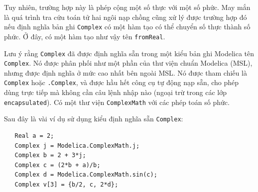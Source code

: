 Tuy nhiên, trường hợp này là phép cộng một số thực với một số phức. May mắn là quá trình tra cứu toán tử hai ngôi nạp chồng cũng xử lý được trường hợp đó nếu định nghĩa bản ghi \texttt{Complex} có một hàm tạo có thể chuyển số thực thành số phức. Ở đây, có một hàm tạo như vậy tên \texttt{fromReal}.

Lưu ý rằng \texttt{Complex} đã được định nghĩa sẵn trong một kiểu bản ghi Modelica tên \texttt{Complex}. Nó được phân phối như một phần của thư viện chuẩn Modelica (MSL), nhưng được định nghĩa ở mức cao nhất bên ngoài MSL. Nó được tham chiếu là \texttt{Complex} hoặc \texttt{.Complex}, và được hầu hết công cụ tự động nạp sẵn, cho phép dùng trực tiếp mà không cần câu lệnh nhập nào (ngoại trừ trong các lớp \texttt{encapsulated}). Có một thư viện \texttt{ComplexMath} với các phép toán số phức.

Sau đây là vài ví dụ sử dụng kiểu định nghĩa sẵn \texttt{Complex}:
\begin{verbatim}
   Real a = 2;
   Complex j = Modelica.ComplexMath.j;
   Complex b = 2 + 3*j;
   Complex c = (2*b + a)/b;
   Complex d = Modelica.ComplexMath.sin(c);
   Complex v[3] = {b/2, c, 2*d};
\end{verbatim}

